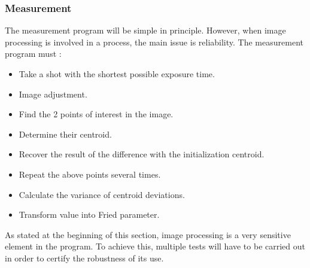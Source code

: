 \subsubsection{Measurement}
The measurement program will be simple in principle. However, when image processing is involved in a process, the main issue is reliability.
The measurement program must :
\begin{itemize}
    \item Take a shot with the shortest possible exposure time.
    \item Image adjustment.
    \item Find the 2 points of interest in the image.
    \item Determine their centroid.
    \item Recover the result of the difference with the initialization centroid.
    \item Repeat the above points several times.
    \item Calculate the variance of centroid deviations.
    \item Transform value into Fried parameter.
\end{itemize}
As stated at the beginning of this section, image processing is a very sensitive element in the program. To achieve this,
multiple tests will have to be carried out in order to certify the robustness of its use.
\newpage
